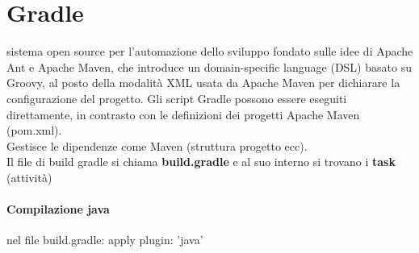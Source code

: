 \documentclass[10pt,a4paper]{book}
\begin{document}
\section{Gradle}
sistema open source per l'automazione dello sviluppo fondato sulle idee di Apache Ant e Apache Maven, che introduce un domain-specific language (DSL) basato su Groovy, al posto della modalità XML usata da Apache Maven per dichiarare la configurazione del progetto. Gli script Gradle possono essere eseguiti direttamente, in contrasto con le definizioni dei progetti Apache Maven (pom.xml).\\
Gestisce le dipendenze come Maven (struttura progetto ecc).\\
Il file di build gradle si chiama \textbf{build.gradle} e al suo interno si trovano i \textbf{task} (attività)

\paragraph{Compilazione java}
nel file build.gradle: apply plugin: 'java'


\end{document}
